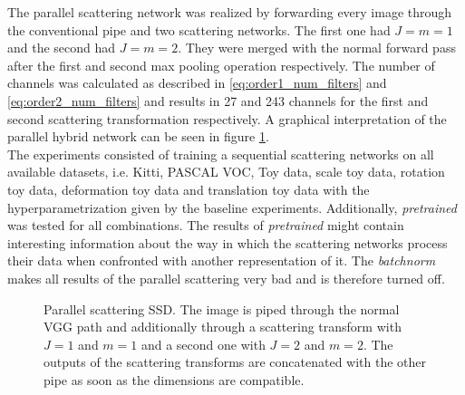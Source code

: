 The parallel scattering network was realized by forwarding every image through the conventional pipe and two scattering networks. The first one had $J=m =1$ and the second had $J=m=2$. They were merged with the normal forward pass after the first and second max pooling operation respectively. The number of channels was calculated as described in \ref{eq:order1_num_filters} and \ref{eq:order2_num_filters} and results in 27 and 243 channels for the first and second scattering transformation respectively. A graphical interpretation of the parallel hybrid network can be seen in figure \ref{fig:parallel_scattering_SSD}.  \\
The experiments consisted of training a sequential scattering networks on all available datasets, i.e. Kitti, PASCAL VOC, Toy data, scale toy data, rotation toy data, deformation toy data and translation toy data with the hyperparametrization given by the baseline experiments. Additionally, \textit{pretrained} was tested for all combinations. The results of \textit{pretrained} might contain interesting information about the way in which the scattering networks process their data when confronted with another representation of it. The \textit{batchnorm} makes all results of the parallel scattering very bad and is therefore turned off. 


\begin{figure}[!htb]
	\centering
	\caption{Parallel scattering SSD. The image is piped through the normal VGG path and additionally through a scattering transform with $J=1$ and $m=1$ and a second one with $J=2$ and $m=2$. The outputs of the scattering transforms are concatenated with the other pipe as soon as the dimensions are compatible.}
	\label{fig:parallel_scattering_SSD}
\end{figure}

